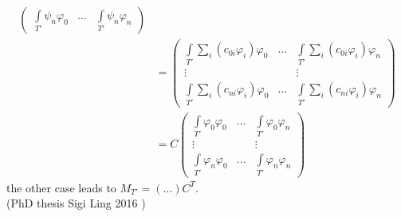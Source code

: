 \begin{example}
\begin{align*}
\begin{pmatrix}
		\int \limits_{T'} \psi_n\varphi_0 & \dots & \int \limits_{T'} \psi_n\varphi_n
		\end{pmatrix}\\
		&=
		\begin{pmatrix}
		\int \limits_{T'} \sum \limits_i \left( c_{0i} \varphi_i \right)\varphi_0 & \dots & \int \limits_{T'} \sum \limits_i\left( c_{0i} \varphi_i \right)\varphi_n \\
		\vdots 					 		  & 	  & \vdots\\
		\int \limits_{T'} \sum \limits_i\left( c_{ni} \varphi_i \right)\varphi_0 & \dots & \int \limits_{T'} \sum \limits_i\left( c_{ni} \varphi_i \right)\varphi_n
		\end{pmatrix}\\
		&= C 
		\begin{pmatrix}
		\int \limits_{T'} \varphi_0\varphi_0 & \dots & \int \limits_{T'} \varphi_0\varphi_n \\
		\vdots 					 		  & 	  & \vdots\\
		\int \limits_{T'} \varphi_n\varphi_0 & \dots & \int \limits_{T'} \varphi_n\varphi_n
		\end{pmatrix}
	\end{align*}
	the other case leads to $M_{T'} = (\dots) C^T$.\\
	(PhD thesis Sigi Ling 2016 )
\end{example}
